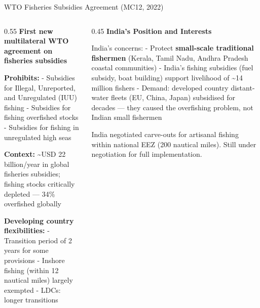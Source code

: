 \documentclass[
  ignorenonframetext,
  aspectratio=169,
]{beamer}
\makeatletter
\let\quarto@originallabel\label
\DeclareRobustCommand*{\label}[1]{\quarto@originallabel{#1}}
\makeatother
\begin{document}
\begin{frame}{WTO Fisheries Subsidies Agreement (MC12, 2022)}
\label{wto-fisheries-subsidies-agreement-mc12-2022}
\begin{columns}[T]
\begin{column}{0.55\linewidth}
\textbf{First new multilateral WTO agreement on fisheries subsidies}

\textbf{Prohibits:} - Subsidies for Illegal, Unreported, and Unregulated
(IUU) fishing - Subsidies for fishing overfished stocks - Subsidies for
fishing in unregulated high seas

\textbf{Context:} \textasciitilde USD 22 billion/year in global
fisheries subsidies; fishing stocks critically depleted --- 34\%
overfished globally

\textbf{Developing country flexibilities:} - Transition period of 2
years for some provisions - Inshore fishing (within 12 nautical miles)
largely exempted - LDCs: longer transitions
\end{column}

\begin{column}{0.45\linewidth}
\textbf{India's Position and Interests}

India's concerns: - Protect \textbf{small-scale traditional fishermen}
(Kerala, Tamil Nadu, Andhra Pradesh coastal communities) - India's
fishing subsidies (fuel subsidy, boat building) support livelihood of
\textasciitilde14 million fishers - Demand: developed country
distant-water fleets (EU, China, Japan) subsidised for decades --- they
caused the overfishing problem, not Indian small fishermen

India negotiated carve-outs for artisanal fishing within national EEZ
(200 nautical miles). Still under negotiation for full implementation.
\end{column}
\end{columns}
\end{frame}
\end{document}
